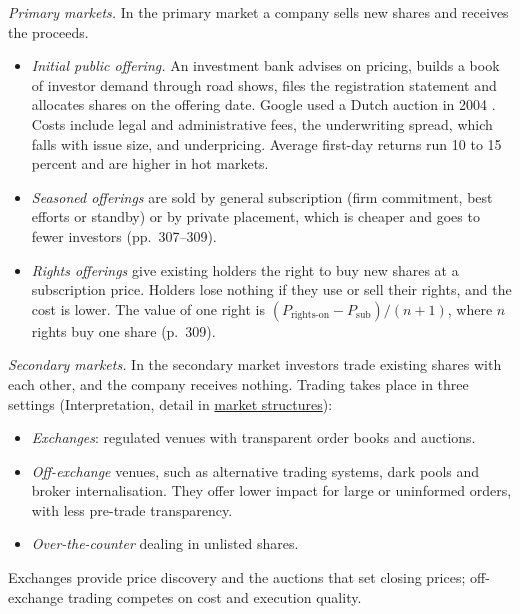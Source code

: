 \begin{qfdefinition}\label{def:equity-issuance-trading-liquidity}
 \emph{Primary markets.} In the primary market a company sells new shares and receives the proceeds.
\begin{itemize}
\item \emph{Initial public offering.} An investment bank advises on pricing, builds a book of investor demand through road shows, files the registration statement and allocates shares on the offering date. Google used a Dutch auction in 2004 \citep[pp.~302--305]{applied-corporate-finance-2014}. Costs include legal and administrative fees, the underwriting spread, which falls with issue size, and underpricing. Average first-day returns run 10 to 15 percent and are higher in hot markets.
\item \emph{Seasoned offerings} are sold by general subscription (firm commitment, best efforts or standby) or by private placement, which is cheaper and goes to fewer investors (pp.~307--309).
\item \emph{Rights offerings} give existing holders the right to buy new shares at a subscription price. Holders lose nothing if they use or sell their rights, and the cost is lower. The value of one right is $(P_{\text{rights-on}}-P_{\text{sub}})/(n+1)$, where $n$ rights buy one share (p.~309).
\end{itemize}

\emph{Secondary markets.} In the secondary market investors trade existing shares with each other, and the company receives nothing. Trading takes place in three settings (Interpretation, detail in \hyperref[def:market-structures-venues]{market structures}):
\begin{itemize}
\item \emph{Exchanges}: regulated venues with transparent order books and auctions.
\item \emph{Off-exchange} venues, such as alternative trading systems, dark pools and broker internalisation. They offer lower impact for large or uninformed orders, with less pre-trade transparency.
\item \emph{Over-the-counter} dealing in unlisted shares.
\end{itemize}
Exchanges provide price discovery and the auctions that set closing prices; off-exchange trading competes on cost and execution quality.


\end{qfdefinition}
